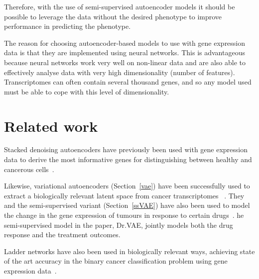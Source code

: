 Therefore, with the use of semi-supervised autoencoder models it should be possible to leverage the data without
the desired phenotype to improve performance in predicting the phenotype.

The reason for choosing autoencoder-based models to use with gene expression data is that they are implemented
using neural networks. This is advantageous because neural networks work very well on non-linear data and are
also able to effectively analyse data with very high dimensionality (number of features). Transcriptomes can
often contain several thousand genes, and so any model used must be able to cope with this level of dimensionality.

\section{Related work}

Stacked denoising autoencoders have previously been used with gene expression data to derive the most informative
genes for distinguishing between healthy and cancerous cells~\cite{8217828}.

Likewise, variational autoencoders (Section~\ref{vae}) have been successfully used to extract a biologically relevant latent 
space from cancer transcriptomes ~\cite{Way2018ExtractingAB}. They and the semi-supervised variant (Section~\ref{ssVAE}) 
have also been used to model the change in the gene expression of tumours in response to certain drugs~\cite{10.1093/bioinformatics/btz158}.
he semi-supervised model in the paper, Dr.VAE, jointly models both the drug response and the treatment outcomes.

Ladder networks have also been used in biologically relevant ways, achieving state of the art accuracy in the binary cancer classification
problem using gene expression data~\cite{10.1007/978-3-319-78723-7_23}.